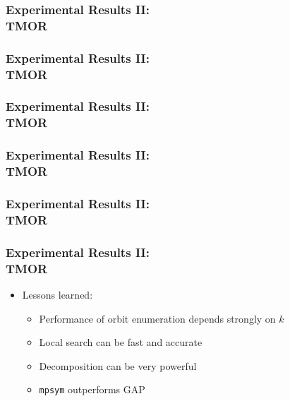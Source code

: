 \documentclass{beamer}
\newcommand{\inputressource}[1]{}
\begin{document}
\begin{frame}
  \frametitle{Experimental Results II:\\TMOR}

  \scalebox{.7}{\inputressource{exynos_lineplot.tex}}
\end{frame}

\begin{frame}
  \frametitle{Experimental Results II:\\TMOR}

  \scalebox{.7}{\inputressource{parallella_lineplot.tex}}
\end{frame}

\begin{frame}
  \frametitle{Experimental Results II:\\TMOR}

  \scalebox{.7}{\inputressource{haec_lineplot.tex}}
\end{frame}

\begin{frame}
  \frametitle{Experimental Results II:\\TMOR}

  \scalebox{.7}{\inputressource{haec_histogram.tex}}
\end{frame}

\begin{frame}
  \frametitle{Experimental Results II:\\TMOR}

  \scalebox{.7}{\inputressource{kalray_lineplot.tex}}
\end{frame}

\begin{frame}
  \frametitle{Experimental Results II:\\TMOR}

  \begin{itemize}
    \item Lessons learned:
      \begin{itemize}
        \setlength\itemsep{.25cm}

        \item<1-> Performance of orbit enumeration depends strongly on $k$
        \item<2-> Local search can be fast and accurate
        \item<3-> Decomposition can be very powerful
        \item<4-> \texttt{mpsym} outperforms GAP
      \end{itemize}
  \end{itemize}
\end{frame}
\end{document}
